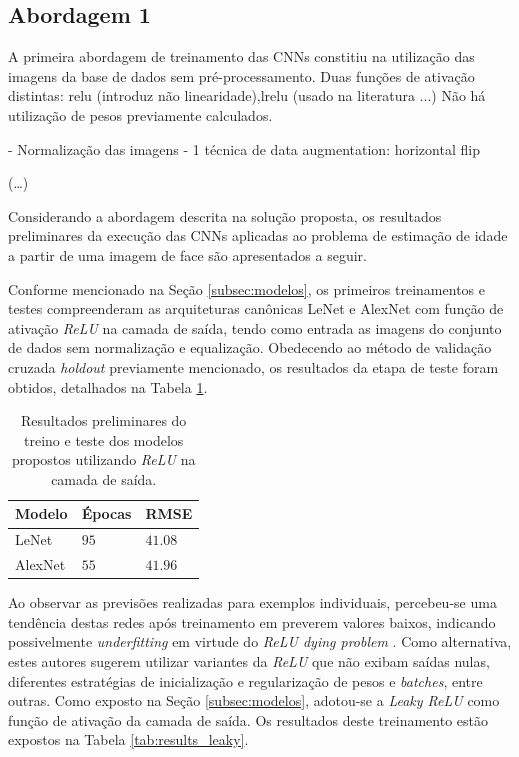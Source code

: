 
\subsection{Abordagem 1}

A primeira abordagem de treinamento das CNNs constitiu na utilização das imagens da base de dados sem pré-processamento. Duas funções de ativação distintas: relu (introduz não linearidade),lrelu (usado na literatura ...)
Não há utilização de pesos previamente calculados.

- Normalização das imagens
- 1 técnica de data augmentation: horizontal flip

(\ldots)





Considerando a abordagem descrita na solução proposta, os resultados preliminares da execução das CNNs aplicadas ao problema de estimação de idade a partir de uma imagem de face são apresentados a seguir.

Conforme mencionado na Seção \ref{subsec:modelos}, os primeiros treinamentos e testes compreenderam as arquiteturas canônicas LeNet e AlexNet com função de ativação \emph{ReLU} na camada de saída, tendo como entrada as imagens do conjunto de dados sem normalização e equalização. Obedecendo ao método de validação cruzada \emph{holdout} previamente mencionado, os resultados da etapa de teste foram obtidos, detalhados na Tabela \ref{tab:results_relu}.

\begin{table}[!ht]
     \caption{Resultados preliminares do treino e teste dos modelos propostos utilizando \emph{ReLU} na camada de saída.}
     \label{tab:results_relu}
     \centering
     \begin{tabular}{l l l}
          \toprule
          Modelo & Épocas &RMSE \\
          \midrule
          LeNet & $95$ & $41.08$ \\
          AlexNet & $55$ & $41.96$\\
          \bottomrule
     \end{tabular}
\end{table}

Ao observar as previsões realizadas para exemplos individuais, percebeu-se uma tendência destas redes após treinamento em preverem valores baixos, indicando possivelmente \emph{underfitting} em virtude do \emph{ReLU dying problem} \cite{djork2015elus, dabal2018elus}. Como alternativa, estes autores sugerem  utilizar variantes da \emph{ReLU} que não exibam saídas nulas, diferentes estratégias de inicialização e regularização de pesos e \emph{batches}, entre outras. Como exposto na Seção \ref{subsec:modelos}, adotou-se a \emph{Leaky ReLU} como função de ativação da camada de saída. Os resultados deste treinamento estão expostos na Tabela \ref{tab:results_leaky}.

